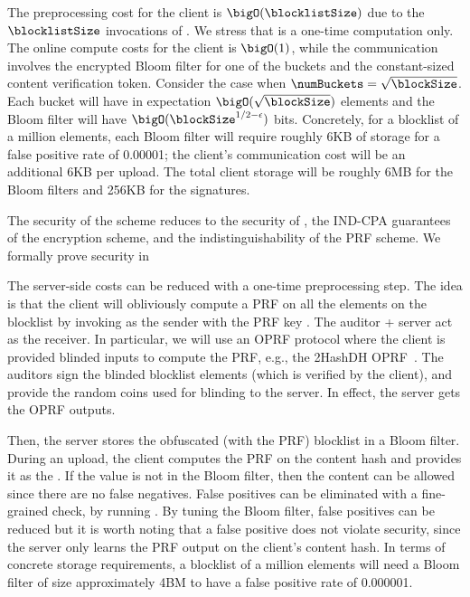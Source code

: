 %
The preprocessing cost for the client is $\bigO(\blocklistSize)$ due to the $\blocklistSize$ invocations of \oprfFunc. We stress that is a one-time computation only. The online compute costs for the client is $\bigO(1)$, while the communication involves the encrypted Bloom filter for one of the buckets and the constant-sized content verification token. Consider the case when $\numBuckets = \sqrt{\blockSize}$. Each bucket will have in expectation $\bigO(\sqrt{\blockSize})$ elements and the Bloom filter will have  $\bigO(\blockSize^{1/2 - \epsilon})$ bits. Concretely, for a blocklist of a million elements, each Bloom filter will require roughly 6KB of storage for a false positive rate of 0.00001; the client's communication cost will be an additional 6KB per upload. The total client storage will be roughly 6MB for the Bloom filters and 256KB for the signatures. 

The security of the scheme reduces to the security of \protocolEM, the IND-CPA guarantees of the encryption scheme, and the indistinguishability of the PRF scheme. We formally prove security in 

\fi 


\iffalse
The server-side costs can be reduced with a one-time preprocessing step. The idea is that the client will obliviously compute a PRF on all the elements on the blocklist by invoking \oprfFunc as the sender with the PRF key \prfKeyClient. The auditor + server act as the receiver. In particular, we will use an OPRF protocol where the client is provided blinded inputs to compute the PRF, e.g., the 2HashDH OPRF~\cite{jarecki2014round}. The auditors sign the blinded blocklist elements (which is verified by the client), and provide the random coins used for blinding to the server. In effect, the server gets the OPRF outputs.  

Then, the server stores the obfuscated (with the PRF) blocklist in a Bloom filter. During an upload, the client computes the PRF on the content hash and provides it as the \contentToken. If the value is not in the Bloom filter, then the content can be allowed since there are no false negatives. False positives can be eliminated with a fine-grained check, by running \protocolEM. By tuning the Bloom filter, false positives can be reduced but it is worth noting that a false positive does not violate security, since the server only learns the PRF output on the client's content hash. In terms of concrete storage requirements, a blocklist of a million elements will need a Bloom filter of size approximately 4BM to have a false positive rate of 0.000001. 
 

